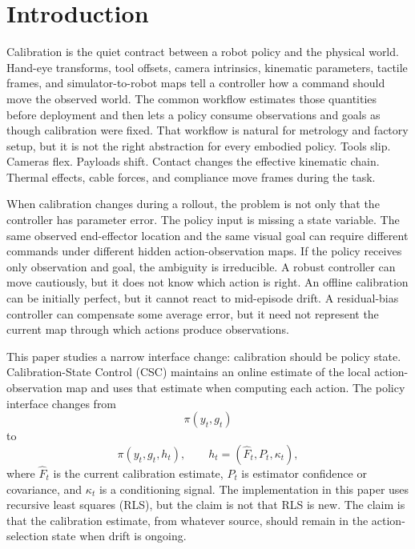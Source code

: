 \documentclass{article}
\newcommand{\obs}{y}
\newcommand{\goal}{g}
\newcommand{\cmaphat}{\hat F}
\newcommand{\cov}{P}
\newcommand{\state}{h}
\begin{document}
\section{Introduction}

Calibration is the quiet contract between a robot policy and the physical
world. Hand-eye transforms, tool offsets, camera intrinsics, kinematic
parameters, tactile frames, and simulator-to-robot maps tell a controller how a
command should move the observed world. The common workflow estimates those
quantities before deployment and then lets a policy consume observations and
goals as though calibration were fixed. That workflow is natural for metrology
and factory setup, but it is not the right abstraction for every embodied
policy. Tools slip. Cameras flex. Payloads shift. Contact changes the effective
kinematic chain. Thermal effects, cable forces, and compliance move frames
during the task.

When calibration changes during a rollout, the problem is not only that the
controller has parameter error. The policy input is missing a state variable.
The same observed end-effector location and the same visual goal can require
different commands under different hidden action-observation maps. If the
policy receives only observation and goal, the ambiguity is irreducible. A
robust controller can move cautiously, but it does not know which action is
right. An offline calibration can be initially perfect, but it cannot react to
mid-episode drift. A residual-bias controller can compensate some average
error, but it need not represent the current map through which actions produce
observations.

This paper studies a narrow interface change: calibration should be policy
state. Calibration-State Control (CSC) maintains an online estimate of the
local action-observation map and uses that estimate when computing each action.
The policy interface changes from
\[
  \pi(\obs_t,\goal_t)
\]
to
\[
  \pi(\obs_t,\goal_t,\state_t),
  \qquad \state_t=(\cmaphat_t,\cov_t,\kappa_t),
\]
where $\cmaphat_t$ is the current calibration estimate, $\cov_t$ is estimator
confidence or covariance, and $\kappa_t$ is a conditioning signal. The
implementation in this paper uses recursive least squares (RLS), but the
claim is not that RLS is new. The claim is that the calibration estimate, from
whatever source, should remain in the action-selection state when drift is
ongoing.
\end{document}
